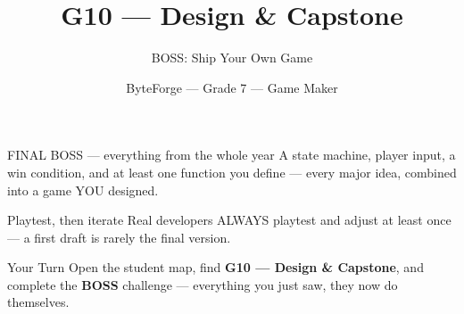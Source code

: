 \documentclass[aspectratio=169]{beamer}
\title{G10 — Design \& Capstone}
\subtitle{BOSS: Ship Your Own Game}
\author{ByteForge --- Grade 7 --- Game Maker}
\date{}
\begin{document}
\begin{frame}
    \titlepage
\end{frame}

\begin{frame}{FINAL BOSS — everything from the whole year}
    \Large
    A state machine, player input, a win condition, and at least one function you define — every major idea, combined into a game YOU designed.

    \begin{center}
    \end{center}
\end{frame}

\begin{frame}{Playtest, then iterate}
    \Large
    Real developers ALWAYS playtest and adjust at least once — a first draft is rarely the final version.
\end{frame}

\begin{frame}{Your Turn}
    \Large
    Open the student map, find \textbf{G10 — Design \& Capstone}, and complete
    the \textbf{BOSS} challenge --- everything you just saw, they now do themselves.
\end{frame}
\end{document}
